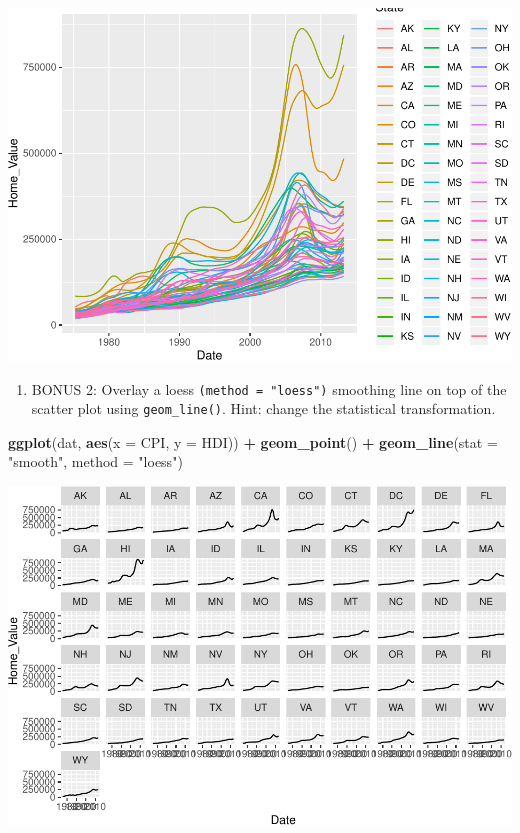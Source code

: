 \documentclass[
]{book}
\newenvironment{Shaded}{\begin{snugshade}}{\end{snugshade}}
\newcommand{\DataTypeTok}[1]{\textcolor[rgb]{0.13,0.29,0.53}{#1}}
\newcommand{\KeywordTok}[1]{\textcolor[rgb]{0.13,0.29,0.53}{\textbf{#1}}}
\newcommand{\NormalTok}[1]{#1}
\newcommand{\OperatorTok}[1]{\textcolor[rgb]{0.81,0.36,0.00}{\textbf{#1}}}
\newcommand{\StringTok}[1]{\textcolor[rgb]{0.31,0.60,0.02}{#1}}
\providecommand{\tightlist}{%
  \setlength{\itemsep}{0pt}\setlength{\parskip}{0pt}}
\begin{document}
\begin{alert}
\includegraphics{R/Rgraphics/figures/unnamed-chunk-180-1.pdf}

\begin{enumerate}
\def\labelenumi{\arabic{enumi}.}
\setcounter{enumi}{5}
\tightlist
\item
  BONUS 2: Overlay a loess \texttt{(method\ =\ "loess")} smoothing line on top of the scatter plot using \texttt{geom\_line()}. Hint: change the statistical transformation.
\end{enumerate}

\begin{Shaded}
\begin{Highlighting}[]
\KeywordTok{ggplot}\NormalTok{(dat, }\KeywordTok{aes}\NormalTok{(}\DataTypeTok{x =}\NormalTok{ CPI, }\DataTypeTok{y =}\NormalTok{ HDI)) }\OperatorTok{+}
\StringTok{  }\KeywordTok{geom\_point}\NormalTok{() }\OperatorTok{+}
\StringTok{  }\KeywordTok{geom\_line}\NormalTok{(}\DataTypeTok{stat =} \StringTok{"smooth"}\NormalTok{, }\DataTypeTok{method =} \StringTok{"loess"}\NormalTok{)}
\end{Highlighting}
\end{Shaded}

\includegraphics{R/Rgraphics/figures/unnamed-chunk-181-1.pdf}

\end{alert}
\end{document}
